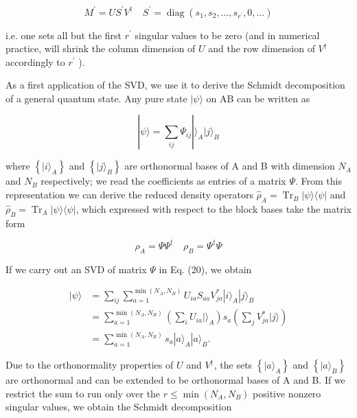 \documentclass[12pt]{article}
\begin{document}
\begin{equation*}
M^{\prime}=U S^{\prime} V^{\dagger} \quad S^{\prime}=\operatorname{diag}\left(s_{1}, s_{2}, \ldots, s_{r^{\prime}}, 0, \ldots\right) \tag{19}
\end{equation*}


i.e. one sets all but the first $r^{\prime}$ singular values to be zero (and in numerical practice, will shrink the column dimension of $U$ and the row dimension of $V^{\dagger}$ accordingly to $r^{\prime}$ ).

As a first application of the SVD, we use it to derive the Schmidt decomposition of a general quantum state. Any pure state $|\psi\rangle$ on $\mathrm{AB}$ can be written as


\begin{equation*}
|\psi\rangle=\sum_{i j} \Psi_{i j}|\rangle_{A}|j\rangle_{B} \tag{20}
\end{equation*}


where $\left\{|i\rangle_{A}\right\}$ and $\left\{|j\rangle_{B}\right\}$ are orthonormal bases of A and B with dimension $N_{A}$ and $N_{B}$ respectively; we read the coefficients as entries of a matrix $\Psi$. From this representation we can derive the reduced density operators $\hat{\rho}_{A}=\operatorname{Tr}_{B}|\psi\rangle\langle\psi|$ and $\hat{\rho}_{B}=\operatorname{Tr}_{A}|\psi\rangle\langle\psi|$, which expressed with respect to the block bases take the matrix form


\begin{equation*}
\rho_{A}=\Psi \Psi^{\dagger} \quad \rho_{B}=\Psi^{\dagger} \Psi \tag{21}
\end{equation*}


If we carry out an SVD of matrix $\Psi$ in Eq. (20), we obtain


\begin{align*}
|\psi\rangle & =\sum_{i j} \sum_{a=1}^{\min \left(N_{A}, N_{B}\right)} U_{i a} S_{a a} V_{j a}^{*}|i\rangle_{A}|j\rangle_{B} \\
& =\sum_{a=1}^{\min \left(N_{A}, N_{B}\right)}\left(\sum_{i} U_{i a}|\rangle_{A}\right) s_{a}\left(\sum_{j} V_{j a}^{*}|j\rangle\right) \\
& =\sum_{a=1}^{\min \left(N_{A}, N_{B}\right)} s_{a}|a\rangle_{A}|a\rangle_{B} . \tag{22}
\end{align*}


Due to the orthonormality properties of $U$ and $V^{\dagger}$, the sets $\left\{|a\rangle_{A}\right\}$ and $\left\{|a\rangle_{B}\right\}$ are orthonormal and can be extended to be orthonormal bases of A and B. If we restrict the sum to run only over the $r \leq \min \left(N_{A}, N_{B}\right)$ positive nonzero singular values, we obtain the Schmidt decomposition
\end{document}
